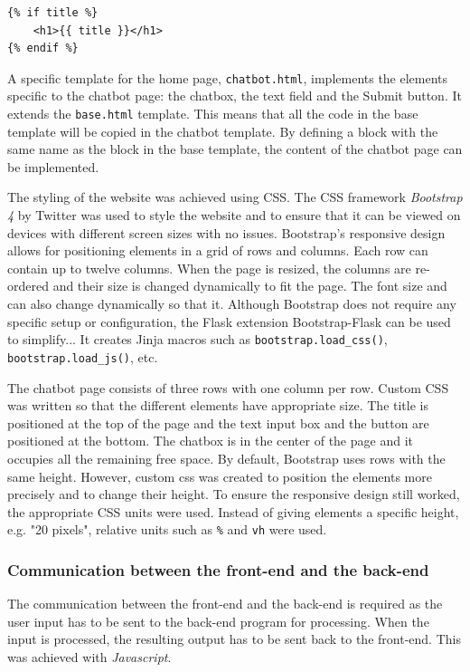 \documentclass[12pt,a4paper]{article}
\newcommand{\captionstyle}[1] {
    \small{\textit{#1}}
}
\begin{document}
\begin{lstlisting}[caption={\captionstyle{Using a variable passed from Python in a Jinja template.}}, label={lst:jinjavar}]
{% if title %}
    <h1>{{ title }}</h1>
{% endif %}
\end{lstlisting}

A specific template for the home page, \texttt{chatbot.html}, implements the elements specific to the chatbot page: the chatbox, the text field and the Submit button. It extends the \texttt{base.html} template. This means that all the code in the base template will be copied in the chatbot template. By defining a block with the same name as the block in the base template, the content of the chatbot page can be implemented.

The styling of the website was achieved using CSS. The CSS framework \textit{Bootstrap 4} by Twitter was used to style the website and to ensure that it can be viewed on devices with different screen sizes with no issues. Bootstrap's responsive design allows for positioning elements in a grid of rows and columns. Each row can contain up to twelve columns. When the page is resized, the columns are re-ordered and their size is changed dynamically to fit the page. The font size and can also change dynamically so that it. Although Bootstrap does not require any specific setup or configuration, the Flask extension Bootstrap-Flask can be used to simplify... It creates Jinja macros such as \texttt{bootstrap.load\_css()}, \texttt{bootstrap.load\_js()}, etc.

The chatbot page consists of three rows with one column per row. Custom CSS was written so that the different elements have appropriate size. The title is positioned at the top of the page and the text input box and the button are positioned at the bottom. The chatbox is in the center of the page and it occupies all the remaining free space. By default, Bootstrap uses rows with the same height. However, custom css was created to position the elements more precisely and to change their height. To ensure the responsive design still worked, the appropriate CSS units were used. Instead of giving elements a specific height, e.g. "20 pixels", relative units such as \texttt{\%} and \texttt{vh} were used.

\subsubsection{Communication between the front-end and the back-end}
The communication between the front-end and the back-end is required as the user input has to be sent to the back-end program for processing. When the input is processed, the resulting output has to be sent back to the front-end. This was achieved with \textit{Javascript}. 
\end{document}
